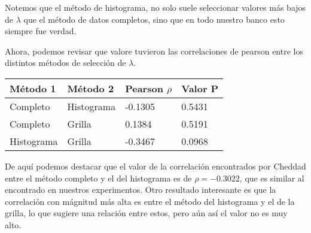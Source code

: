     Notemos que el m\'etodo de histograma, no solo suele seleccionar valores m\'as bajos de $\lambda$ que el m\'etodo de datos completos, sino que en todo nuestro banco esto siempre fue verdad.

    Ahora, podemos revisar que valore tuvieron las correlaciones de pearson entre los distintos m\'etodos de selecci\'on de $\lambda$.


    \begin{table}[H]
        \centering
        \begin{tabular}{|l|l|l|l|}
            \hline
            M\'etodo 1 & M\'etodo 2 & Pearson $\rho$ & Valor P \\ \hline
            Completo                  & Histograma                & -0.1305   & 0.5431  \\ 
            Completo                  & Grilla                    & 0.1384    & 0.5191  \\ 
            Histograma                & Grilla                    & -0.3467   & 0.0968  \\ \hline
        \end{tabular}
    \end{table}

    De aqu\'i podemos destacar que el valor de la correlaci\'on encontrados por Cheddad \cite{boxcoximg} entre el m\'etodo completo y el del histograma es de $\rho=-0.3022$, que es similar al encontrado en nuestros experimentos. Otro resultado interesante es que la correlaci\'on con m\'agnitud m\'as alta es entre el m\'etodo del histograma y el de la grilla, lo que sugiere una relaci\'on entre estos, pero a\'un as\'i el valor no es muy alto.

